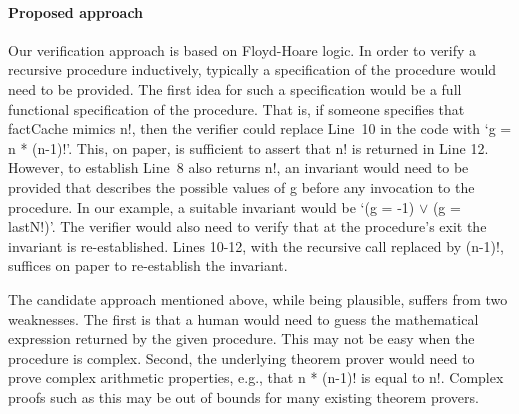 \paragraph{Proposed approach}
%
%
%
Our verification approach is based on Floyd-Hoare logic. In order to verify a recursive procedure
inductively, typically a specification of the procedure would need to be
provided. The first idea for such a specification would be a full
functional specification of the procedure. That is, if someone specifies
that factCache mimics n!, then the verifier could replace Line~10 in the
code with `g = n * (n-1)!'. This, on paper, is sufficient to assert that n!
is returned in Line 12. However, to establish Line~8 also returns n!, an
invariant would need to be provided that describes the possible values of g
before any invocation to the procedure. In our example, a suitable
invariant would be `(g = -1) $\vee$ (g = lastN!)'. The verifier would also
need to verify that at the procedure's exit the invariant is
re-established. Lines 10-12, with the recursive call replaced by (n-1)!,
suffices on paper  to re-establish the invariant.

The candidate approach mentioned above, while being plausible, suffers from
two weaknesses. The first is that a human would need to guess the
mathematical expression returned by the given procedure. This may not be
easy when the procedure is complex. Second, the underlying theorem prover
would need to prove complex arithmetic properties, e.g., that n * (n-1)! is
equal to n!. Complex proofs such as this may be out of bounds for many
existing theorem provers.


